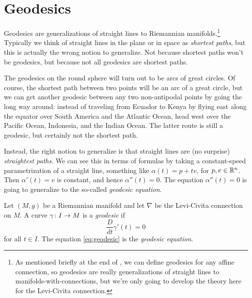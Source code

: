
\section{Geodesics}
\label{sec:geodesics}

Geodesics are generalizations of straight lines to Riemannian manifolds.\footnote{As mentioned briefly at the end of , we can define geodesics for any affine connection, so geodesics are really generalizations of straight lines to manifolds-with-connections, but we're only going to develop the theory here for the Levi-Civita connection.} Typically we think of straight lines in the plane or in space as \emph{shortest paths}, but this is actually the wrong notion to generalize. Not because shortest paths won't be geodesics, but because not all geodesics are shortest paths.

\begin{example}
	The geodesics on the round sphere will turn out to be arcs of great circles. Of course, the shortest path between two points will be an arc of a great circle, but we can get another geodesic between any two non-antipodal points by going the long way around: instead of traveling from Ecuador to Kenya by flying east along the equator over South America and the Atlantic Ocean, head west over the Pacific Ocean, Indonesia, and the Indian Ocean. The latter route is still a geodesic, but certainly not the shortest path.
\end{example}

Instead, the right notion to generalize is that straight lines are (no surprise) \emph{straightest paths}. We can see this in terms of formulas by taking a constant-speed parametrization of a straight line, something like $\alpha(t) = p + tv$, for $p,v \in \mathbb{R}^n$. Then $\alpha'(t) = v$ is constant, and hence $\alpha''(t) = 0$. The equation $\alpha''(t) = 0$ is going to generalize to the so-called \emph{geodesic equation}.

\begin{definition}\label{def:geodesic}
	Let $(M,g)$ be a Riemannian manifold and let $\nabla$ be the Levi-Civita connection on $M$. A curve $\gamma \colon\thinspace\! I \to M$ is a \emph{geodesic} if 
	\begin{equation} \label{eq:geodesic}
		\frac{D}{dt} \gamma'(t) = 0 
	\end{equation}
	for all $t \in I$. The equation \eqref{eq:geodesic} is the \emph{geodesic equation}.
\end{definition}

